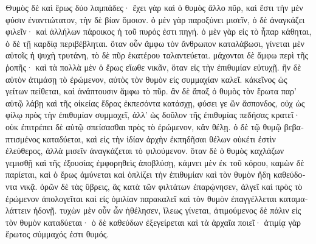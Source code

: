 {\large
{ 
\begin{greek}

\noindent Θυμὸς δὲ καὶ ἔρως δύο λαμπάδες· ἔχει γὰρ καὶ ὁ θυμὸς ἄλλο πῦρ, καὶ ἔστι τὴν μὲν φύσιν ἐναντιώτατον, τὴν δὲ βίαν ὅμοιον. ὁ μὲν γὰρ παροξύνει μισεῖν, ὁ δὲ ἀναγκάζει φιλεῖν· καὶ ἀλλήλων πάροικος ἡ τοῦ πυρός ἐστι πηγή. ὁ μὲν γὰρ εἰς τὸ ἧπαρ κάθηται, ὁ δὲ τῇ καρδίᾳ περιβέβληται.  ὅταν οὖν ἄμφω τὸν ἄνθρωπον καταλάβωσι, γίνεται μὲν αὐτοῖς ἡ ψυχὴ τρυτάνη, τὸ δὲ πῦρ ἑκατέρου ταλαντεύεται. μάχονται δὲ ἄμφω περὶ τῆς ῥοπῆς· καὶ τὰ πολλὰ μὲν ὁ ἔρως εἴωθε νικᾶν, ὅταν εἰς τὴν ἐπιθυμίαν εὐτυχῇ. ἢν δὲ αὐτὸν ἀτιμάσῃ τὸ ἐρώμενον, αὐτὸς τὸν θυμὸν εἰς συμμαχίαν καλεῖ.  κἀκεῖνος ὡς γείτων πείθεται, καὶ ἀνάπτουσιν ἄμφω τὸ πῦρ. ἂν δὲ ἅπαξ ὁ θυμὸς τὸν ἔρωτα παρ' αὑτῷ λάβῃ καὶ τῆς οἰκείας ἕδρας ἐκπεσόντα κατάσχῃ, φύσει γε ὢν ἄσπονδος, οὐχ ὡς φίλῳ πρὸς τὴν ἐπιθυμίαν συμμαχεῖ, ἀλλ' ὡς δοῦλον τῆς ἐπιθυμίας πεδήσας κρατεῖ· οὐκ ἐπιτρέπει δὲ αὐτῷ σπείσασθαι πρὸς τὸ ἐρώμενον, κἂν θέλῃ.  ὁ δὲ τῷ θυμῷ βεβαπτισμένος καταδύεται, καὶ εἰς τὴν ἰδίαν ἀρχὴν ἐκπηδῆσαι θέλων οὐκέτι ἐστὶν ἐλεύθερος, ἀλλὰ μισεῖν ἀναγκάζεται τὸ φιλούμενον. ὅταν δὲ ὁ θυμὸς καχλάζων γεμισθῇ καὶ τῆς ἐξουσίας ἐμφορηθεὶς ἀποβλύσῃ, κάμνει μὲν ἐκ τοῦ κόρου, καμὼν δὲ παρίεται, καὶ ὁ ἔρως ἀμύνεται καὶ ὁπλίζει τὴν ἐπιθυμίαν καὶ τὸν θυμὸν ἤδη καθεύδοντα νικᾷ. ὁρῶν δὲ τὰς ὕβρεις, ἃς κατὰ τῶν φιλτάτων ἐπαρῴνησεν, ἀλγεῖ καὶ πρὸς τὸ ἐρώμενον ἀπολογεῖται καὶ εἰς ὁμιλίαν παρακαλεῖ καὶ τὸν θυμὸν ἐπαγγέλλεται καταμαλάττειν ἡδονῇ.  τυχὼν μὲν οὖν ὧν ἠθέλησεν, ἵλεως γίνεται, ἀτιμούμενος δὲ πάλιν εἰς τὸν θυμὸν καταδύεται· ὁ δὲ καθεύδων ἐξεγείρεται καὶ τὰ ἀρχαῖα ποιεῖ· ἀτιμίᾳ γὰρ ἔρωτος σύμμαχός ἐστι θυμός.

\end{greek}
}
}

